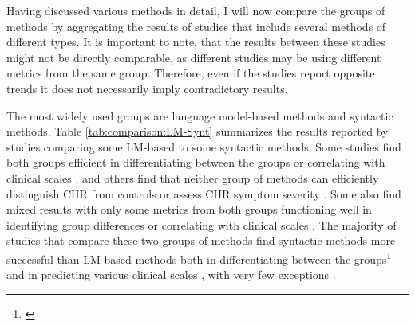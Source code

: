 Having discussed various methods in detail, I will now compare the groups of methods by aggregating the results of studies that include several methods of different types. It is important to note, that the results between these studies might not be directly comparable, as different studies may be using different metrics from the same group. Therefore, even if the studies report opposite trends it does not necessarily imply contradictory results.

The most widely used groups are language model-based methods and syntactic methods. Table \ref{tab:comparison:LM-Synt} summarizes the results reported by studies comparing some LM-based to some syntactic methods. Some studies find both groups efficient in differentiating between the groups \citep{bar2019semantic} or correlating with clinical scales \citep{argolo2023burnishing}, and others find that neither group of methods can efficiently distinguish CHR from controls \citep{haas2020linking} or assess CHR symptom severity \citep{bedi2015automated, corcoran2018prediction}. Some also find mixed results with only some metrics from both groups functioning well in identifying group differences \citep{tang2021natural} or correlating with clinical scales \citep{rezaii2019machine, bilgrami2022construct}. The majority of studies that compare these two groups of methods find syntactic methods more successful than LM-based methods both in differentiating between the groups\footnote{\citet{mitchell2015quantifying, iter2018automatic, corcoran2018prediction, just2020modeling, morgan2021natural, bilgrami2022construct, argolo2023burnishing}} and in predicting various clinical scales \citep{iter2018automatic, liebenthal2022linguistic, jeong2023exploring}, with very few exceptions \citep{rezaii2019machine}.

